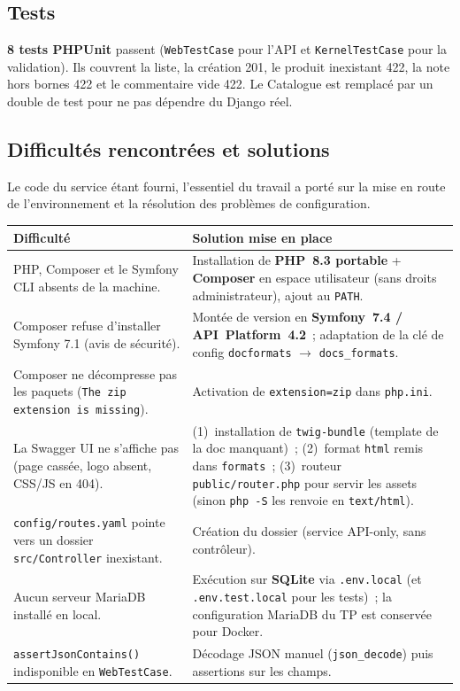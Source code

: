 \documentclass[11pt,a4paper]{article}
\begin{document}
\subsection{Tests}

\textbf{8 tests PHPUnit} passent (\texttt{WebTestCase} pour l'API et \texttt{KernelTestCase} pour la validation). Ils couvrent la liste, la création 201, le produit inexistant 422, la note hors bornes 422 et le commentaire vide 422. Le Catalogue est remplacé par un double de test pour ne pas dépendre du Django réel.

\subsection{Difficultés rencontrées et solutions}

Le code du service étant fourni, l'essentiel du travail a porté sur la mise en route de l'environnement et la résolution des problèmes de configuration.

\begin{tabularx}{\textwidth}{@{}P{5.6cm} Y@{}}
\toprule
\textbf{Difficulté} & \textbf{Solution mise en place} \\
\midrule
PHP, Composer et le Symfony CLI absents de la machine. & Installation de \textbf{PHP~8.3 portable} + \textbf{Composer} en espace utilisateur (sans droits administrateur), ajout au \texttt{PATH}. \\[4pt]
Composer refuse d'installer Symfony 7.1 (avis de sécurité). & Montée de version en \textbf{Symfony~7.4 / API~Platform~4.2}~; adaptation de la clé de config \texttt{docformats} $\rightarrow$ \texttt{docs\_formats}. \\[4pt]
Composer ne décompresse pas les paquets (\texttt{The zip extension is missing}). & Activation de \texttt{extension=zip} dans \texttt{php.ini}. \\[4pt]
La Swagger UI ne s'affiche pas (page cassée, logo absent, CSS/JS en 404). & (1)~installation de \texttt{twig-bundle} (template de la doc manquant)~; (2)~format \texttt{html} remis dans \texttt{formats}~; (3)~routeur \texttt{public/router.php} pour servir les assets (sinon \texttt{php -S} les renvoie en \texttt{text/html}). \\[4pt]
\texttt{config/routes.yaml} pointe vers un dossier \texttt{src/Controller} inexistant. & Création du dossier (service API-only, sans contrôleur). \\[4pt]
Aucun serveur MariaDB installé en local. & Exécution sur \textbf{SQLite} via \texttt{.env.local} (et \texttt{.env.test.local} pour les tests)~; la configuration MariaDB du TP est conservée pour Docker. \\[4pt]
\texttt{assertJsonContains()} indisponible en \texttt{WebTestCase}. & Décodage JSON manuel (\texttt{json\_decode}) puis assertions sur les champs. \\
\bottomrule
\end{tabularx}
\end{document}

